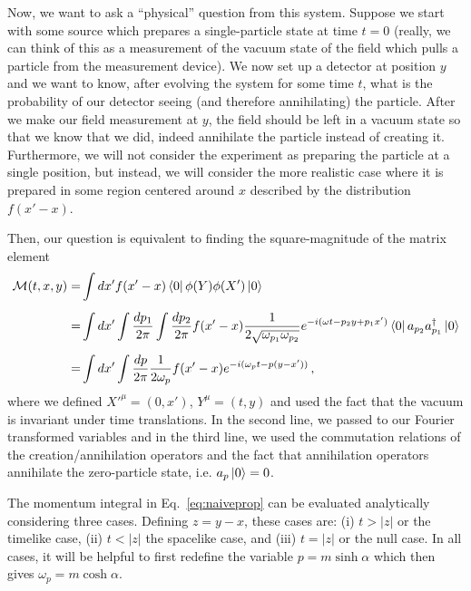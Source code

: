 \documentclass{article}
\numberwithin{equation}{subsection}
\begin{document}
Now, we want to ask a ``physical'' question from this system. Suppose we start with some source which prepares a single-particle state at time $t = 0$ 
(really, we can think of this as a measurement of the vacuum state of the field which pulls a particle from the measurement device). We now set up a detector at 
position $y$ and we want to know, after evolving the system for some time $t$, what is the probability of our detector seeing (and therefore annihilating) the particle. 
After we make our field measurement at $y$, the field should be left in a vacuum state so that we know that we did, indeed annihilate the particle instead of creating it. 
Furthermore, we will not consider the experiment as preparing the particle at a single position, but instead, we will consider the more realistic case where it is prepared 
in some region centered around $x$ described by the distribution $f(x' - x)$.

Then, our question is equivalent to finding the square-magnitude of the matrix element
\begin{equation}\label{eq:naiveprop}
\begin{split}
    \mathcal{M}(t,x,y) =& \int dx'f(x' - x)\bra{0}\phi(Y)\phi(X')\ket{0} \\[0.5em]
        =& \int dx'\int\frac{dp_1}{2\pi}\int\frac{dp_2}{2\pi}f(x'-x)\frac{1}{2\sqrt{\omega_{p_1}\omega_{p_2}}}e^{-i(\omega t - p_2 y + p_1 x')}\bra{0}a_{p_2}a^\dag_{p_1}\ket{0} \\[0.5em]
        =& \int dx'\int\frac{dp}{2\pi}\frac{1}{2\omega_p}f(x'-x)e^{-i(\omega_p t - p(y - x'))}\,,
\end{split}
\end{equation}
where we defined $X'^\mu = (0, x')$, $Y^\mu = (t, y)$ and used the fact that the vacuum is invariant under time translations. In the second line, we passed to 
our Fourier transformed variables and in the third line, we used the commutation relations of the creation/annihilation operators and the fact that annihilation operators 
annihilate the zero-particle state, i.e. $a_p\ket{0} = 0$.

The momentum integral in Eq.~\eqref{eq:naiveprop} can be evaluated analytically considering three cases. Defining $z = y - x$, these cases are: (i) $t > |z|$ or the 
timelike case, (ii) $t < |z|$ the spacelike case, and (iii) $t = |z|$ or the null case. In all cases, it will be helpful to first redefine the variable $p = m \sinh \alpha$ 
which then gives $\omega_p = m \cosh\alpha$.
\end{document}
